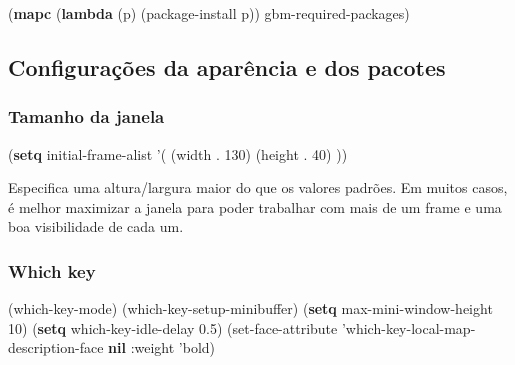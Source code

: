 \documentclass[]{article}
\newenvironment{Shaded}{}{}
\newcommand{\KeywordTok}[1]{\textcolor[rgb]{0.00,0.44,0.13}{\textbf{{#1}}}}
\newcommand{\DecValTok}[1]{\textcolor[rgb]{0.25,0.63,0.44}{{#1}}}
\newcommand{\FloatTok}[1]{\textcolor[rgb]{0.25,0.63,0.44}{{#1}}}
\newcommand{\NormalTok}[1]{{#1}}
\begin{document}
\begin{Shaded}
\begin{Highlighting}[]
\NormalTok{(}\KeywordTok{mapc} \NormalTok{(}\KeywordTok{lambda} \NormalTok{(p)}
        \NormalTok{(package-install p))}
      \NormalTok{gbm-required-packages)}
\end{Highlighting}
\end{Shaded}

\subsection{Configurações da aparência e dos
pacotes}\label{configurauxe7uxf5es-da-aparuxeancia-e-dos-pacotes}

\subsubsection{Tamanho da janela}\label{tamanho-da-janela}

\begin{Shaded}
\begin{Highlighting}[]
\NormalTok{(}\KeywordTok{setq} \NormalTok{initial-frame-alist}
      \NormalTok{'(}
        \NormalTok{(width . }\DecValTok{130}\NormalTok{)}
        \NormalTok{(height . }\DecValTok{40}\NormalTok{)}
        \NormalTok{))}
\end{Highlighting}
\end{Shaded}

Especifica uma altura/largura maior do que os valores padrões. Em muitos
casos, é melhor maximizar a janela para poder trabalhar com mais de um
frame e uma boa visibilidade de cada um.

\subsubsection{Which key}\label{which-key}

\begin{Shaded}
\begin{Highlighting}[]
\NormalTok{(which-key-mode)}
\NormalTok{(which-key-setup-minibuffer)}
\NormalTok{(}\KeywordTok{setq} \NormalTok{max-mini-window-height }\DecValTok{10}\NormalTok{)}
\NormalTok{(}\KeywordTok{setq} \NormalTok{which-key-idle-delay }\FloatTok{0.5}\NormalTok{)}
\NormalTok{(set-face-attribute }
  \NormalTok{'which-key-local-map-description-face }\KeywordTok{nil}
  \NormalTok{:weight 'bold)}
\end{Highlighting}
\end{Shaded}
\end{document}
